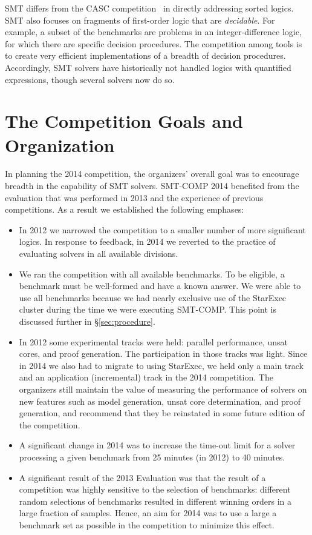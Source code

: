 \documentclass[twoside,11pt]{article}
\begin{document}
SMT differs from the CASC competition~\cite{PSS02} in directly addressing sorted logics. SMT also focuses on fragments of first-order logic that are \emph{decidable}. For example, a subset of the benchmarks are problems in an integer-difference logic, for which there are specific decision procedures. The competition among tools is to create very efficient implementations of a breadth of decision procedures. Accordingly, SMT solvers have historically not handled logics with quantified expressions, though several solvers now do so.

\section{The Competition Goals and Organization}
\label{sec:goals}

In planning the 2014 competition, the organizers' overall goal was to encourage breadth
in the capability of SMT solvers. SMT-COMP 2014 benefited from the evaluation that was performed in 2013 and the experience of previous competitions. As a result we established the following emphases:
\begin{itemize}
\item In 2012 we narrowed the competition to a smaller number of more significant logics. In response to feedback, in 2014 we reverted to the practice of evaluating solvers in all available divisions.
\item We ran the competition with all available benchmarks. To be eligible, a benchmark must be well-formed and have a known answer. We were able to use all benchmarks because we had nearly exclusive use of the StarExec cluster during the time we were executing SMT-COMP. This point is discussed further in \S\ref{sec:procedure}.
\item In 2012 some experimental tracks were held: parallel performance, unsat cores, and proof generation. The participation in those tracks was light. Since in 2014 we also had to migrate to using StarExec, we held only a main track and an application (incremental) track in the 2014 competition. The organizers still maintain the value of measuring the performance of solvers on new features such as model generation, unsat core determination, and proof generation, and recommend that they be reinstated in some future edition of the competition.
\item A significant change in 2014 was to increase the time-out limit for a solver processing a given benchmark from 25 minutes (in 2012) to 40 minutes.
\item A significant result of the 2013 Evaluation was that the result of a competition was highly sensitive to the selection of benchmarks: different random selections of benchmarks resulted in different winning orders in a large fraction of samples. Hence, an aim for 2014 was to use a large a benchmark set as possible in the competition to minimize this effect.



\end{itemize}
\end{document}
